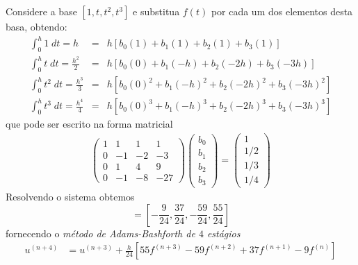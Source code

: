 \begin{ex}
Considere a base $[1, t, t^2, t^3]$ e substitua $f(t)$ por cada um dos elementos desta basa, obtendo:
\begin{eqnarray}
  \int _0^{h} 1  \;dt = h             &=& h\left[ b_0(1)  +b_1(1)    + b_2(1)   + b_3(1)    \right]\\
  \int _0^{h} t  \;dt = \frac{h^2}{2}  &=& h\left[ b_0(0)  +b_1(-h)   + b_2(-2h) + b_3(-3h)  \right]\\
  \int _0^{h} t^2 \;dt = \frac{h^3}{3}  &=& h\left[b_0(0)^2 +b_1(-h)^2  + b_2(-2h)^2+ b_3(-3h)^2 \right]\\
  \int _0^{h} t^3 \;dt = \frac{h^4}{4} &=& h\left[ b_0(0)^3 +b_1(-h)^3  + b_2(-2h)^3+ b_3(-3h)^3 \right]
\end{eqnarray}
que pode ser escrito na forma matricial
\begin{eqnarray}
\left(
  \begin{array}{cccc}
    1  &  1    & 1   & 1\\
    0  &  -1   & -2  & -3\\
    0  &  1    & 4   &  9\\
    0  &  -1   & -8  & -27
  \end{array}
\right)
\left(\begin{array}{c}  b_0 \\ b_1\\ b_2\\b_3   \end{array}\right)
=
\left(\begin{array}{c}  1  \\ 1/2 \\ 1/3 \\ 1/4  \end{array}\right)
\end{eqnarray}
Resolvendo o sistema obtemos
\begin{equation} [b_0,b_1,b_2,b_3]=\left[-\frac{9}{24},\frac{37}{24},-\frac{59}{24},\frac{55}{24}\right] \end{equation}
fornecendo o \emph{método de Adams-Bashforth de $4$ estágios}
\begin{eqnarray}\label{AB4}
  u^{(n+4)}  &= u^{(n+3)}  + \frac{h}{24} [55 f^{(n+3)} -59f^{(n+2)} +37f^{(n+1)} -9f^{(n)}]
\end{eqnarray}
\end{ex}


